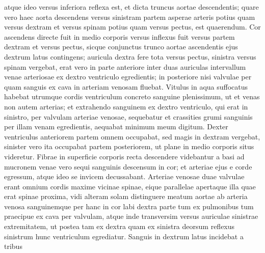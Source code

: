 atque ideo versus inferiora reflexa est, et dicta truncus aortae descendentis;
quare vero haec aorta descendens versus sinistram partem asperae arteris potius quam versus dextram et versus spinam potius quam versus pectus, est quaerendum.
\pend%
\pstart%
Cor ascendens directe fuit in medio corporis versus
inflexus fuit versus partem dextram et versus pectus, sicque conjunctus trunco aortae ascendentis ejus dextrum latus contingens; auricula dextra fere tota versus pectus, sinistra versus spinam vergebat, erat vero in parte anteriore inter duas auriculas intervallum venae arteriosae ex dextro ventriculo egredientis; in posteriore
nisi valvulae per quam sanguis ex cava in arteriam venosam fluebat.
\pend%
\pstart%
Vitulus in aqua suffocatus habebat utrumque cordis ventriculum concreto sanguine plenissimum, ut et venas non autem arterias; et extrahendo sanguinem ex dextro ventriculo, qui erat in sinistro, per valvulam arteriae venosae, sequebatur et crassities grumi sanguinis per illam venam egredientis, aequabat minimum meum digitum.
\pend%
\pstart%
Dexter ventriculus anteriorem partem omnem occupabat, sed magis in dextram vergebat, sinister vero ita occupabat partem posteriorem, ut plane in medio corporis situs videretur.
\pend%
\pstart%
Fibrae in superficie corporis recta descendere videbantur a basi ad mucronem venae vero sequi sanguinis descensum in cor; et arteriae ejus e corde egressum, atque ideo se invicem decussabant.
\pend%
\pstart%
Arteriae venosae duae valvulae erant omnium %
cordis maxime vicinae spinae, eique parallelae apertaque illa quae erat spinae proxima, vidi alteram solam distinguere meatum aortae ab arteria venosa sanguinemque per hanc in cor labi
dextra parte tum ex pulmonibus tum praecipue ex cava per valvulam, atque inde transversim versus auriculae sinistrae extremitatem, ut postea tam ex dextra quam ex sinistra deorsum reflexus sinistrum hunc ventriculum egrediatur. Sanguis in dextrum latus incidebat a tribus
